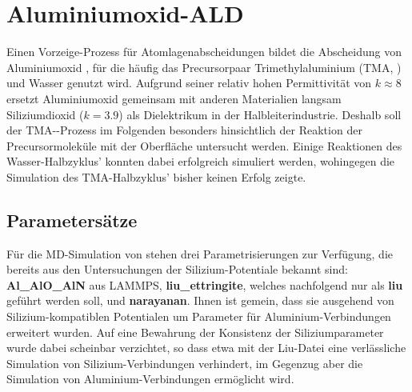 \section{Aluminiumoxid-ALD}
\label{aluminaald}

Einen Vorzeige-Prozess für Atomlagenabscheidungen bildet die Abscheidung von Aluminiumoxid \cite{puurunen_surface_2005}, für die häufig das Precursorpaar Trimethylaluminium (TMA, ) und Wasser genutzt wird.
Aufgrund seiner relativ hohen Permittivität von $k\approx 8$ ersetzt Aluminiumoxid gemeinsam mit anderen Materialien langsam Siliziumdioxid ($k=3.9$) als Dielektrikum in der Halbleiterindustrie.
Deshalb soll der TMA--Prozess im Folgenden besonders hinsichtlich der Reaktion der Precursormoleküle mit der Oberfläche untersucht werden.
Einige Reaktionen des Wasser-Halbzyklus' konnten dabei erfolgreich simuliert werden, wohingegen die Simulation des TMA-Halbzyklus' bisher keinen Erfolg zeigte.


\subsection{Parametersätze}

Für die MD-Simulation von  stehen drei Parametrisierungen zur Verfügung, die bereits aus den Untersuchungen der Silizium-Potentiale bekannt sind:\\
\textbf{Al\_AlO\_AlN} aus LAMMPS\cite{plimpton_lammps_2014}, \textbf{liu\_ettringite}\cite{liu_development_2012}, welches nachfolgend nur als \textbf{liu} geführt werden soll, und \textbf{narayanan}\cite{narayanan_reactive_2012}.
Ihnen ist gemein, dass sie ausgehend von Silizium-kompatiblen Potentialen um Parameter für Aluminium-Verbindungen erweitert wurden.
Auf eine Bewahrung der Konsistenz der Siliziumparameter wurde dabei scheinbar verzichtet, so dass etwa mit der Liu-Datei eine verlässliche Simulation von Silizium-Verbindungen verhindert, im Gegenzug aber die Simulation von Aluminium-Verbindungen ermöglicht wird.

